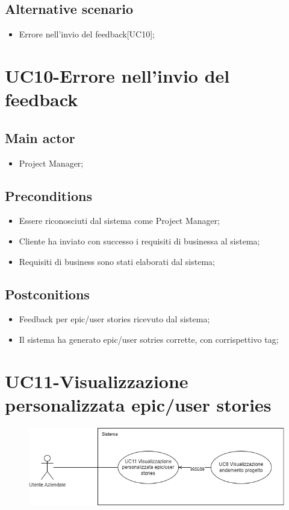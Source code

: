 \documentclass{article}
\begin{document}
    \subsection*{Alternative scenario}
        
        \begin{itemize}
            \item Errore nell'invio del feedback[UC10];
        \end{itemize}
        
\section{UC10-Errore nell'invio del feedback}

     \subsection*{Main actor}
     \begin{itemize}
         \item Project Manager;
     \end{itemize}
   \subsection*{Preconditions}
        \begin{itemize}
            \item Essere riconosciuti dal sistema come Project Manager;
            \item Cliente ha inviato con successo i requisiti di businessa al sistema;
            \item Requisiti di business sono stati elaborati dal sistema;
        \end{itemize}
        
    \subsection*{Postconitions}
        \begin{itemize}
            \item Feedback per epic/user stories ricevuto dal sistema;
            \item Il sistema ha generato epic/user sotries corrette, con corrispettivo tag;
        \end{itemize} 

  
\section{UC11-Visualizzazione personalizzata epic/user stories}
    \begin{figure}[h]
      \centering
      \includegraphics[width=.8\textwidth, height=.6\textheight, keepaspectratio]{documenti/imgUML/UC11.png}
      \label{fig:immagine}
    \end{figure}
    
\end{document}
